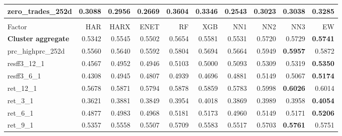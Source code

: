 \begin{longtable}{>{\raggedright\arraybackslash}p{2.6cm}rrrrrrrrr}
zero\_trades\_252d & 0.3088 & 0.2956 & 0.2669 & \textbf{\cellcolor{blue!10}0.3604} & \cellcolor{blue!10}0.3346 & 0.2543 & 0.3023 & 0.3038 & \cellcolor{blue!10}0.3285 \\
\hline
\multicolumn{10}{@{}l}{\textit{Panel F. Momentum}} \\
\hline
Factor & HAR & HARX & ENET & RF & XGB & NN1 & NN2 & NN3 & EW \\
\hline
\textbf{Cluster aggregate} & 0.5342 & \cellcolor{blue!10}0.5545 & \cellcolor{blue!10}0.5502 & \cellcolor{blue!10}0.5654 & \cellcolor{blue!10}0.5581 & \cellcolor{blue!10}0.5531 & \cellcolor{blue!10}0.5720 & \cellcolor{blue!10}0.5729 & \textbf{\cellcolor{blue!10}0.5741} \\
prc\_highprc\_252d & 0.5560 & \cellcolor{blue!10}0.5640 & \cellcolor{blue!10}0.5592 & \cellcolor{blue!10}0.5804 & \cellcolor{blue!10}0.5694 & \cellcolor{blue!10}0.5664 & \cellcolor{blue!10}0.5949 & \textbf{\cellcolor{blue!10}0.5957} & \cellcolor{blue!10}0.5872 \\
resff3\_12\_1 & 0.4567 & \cellcolor{blue!10}0.4952 & \cellcolor{blue!10}0.4946 & \cellcolor{blue!10}0.5103 & \cellcolor{blue!10}0.5000 & \cellcolor{blue!10}0.5093 & \cellcolor{blue!10}0.5309 & \cellcolor{blue!10}0.5319 & \textbf{\cellcolor{blue!10}0.5350} \\
resff3\_6\_1 & 0.4308 & \cellcolor{blue!10}0.4945 & \cellcolor{blue!10}0.4807 & \cellcolor{blue!10}0.4939 & \cellcolor{blue!10}0.4696 & \cellcolor{blue!10}0.4881 & \cellcolor{blue!10}0.5149 & \cellcolor{blue!10}0.5067 & \textbf{\cellcolor{blue!10}0.5174} \\
ret\_12\_1 & 0.5678 & \cellcolor{blue!10}0.5871 & \cellcolor{blue!10}0.5794 & \cellcolor{blue!10}0.5878 & \cellcolor{blue!10}0.5859 & \cellcolor{blue!10}0.5783 & \cellcolor{blue!10}0.5998 & \textbf{\cellcolor{blue!10}0.6026} & \cellcolor{blue!10}0.6014 \\
ret\_3\_1 & 0.3621 & \cellcolor{blue!10}0.3881 & \cellcolor{blue!10}0.3849 & \cellcolor{blue!10}0.3954 & \cellcolor{blue!10}0.4018 & \cellcolor{blue!10}0.3869 & \cellcolor{blue!10}0.3989 & \cellcolor{blue!10}0.3958 & \textbf{\cellcolor{blue!10}0.4054} \\
ret\_6\_1 & 0.4877 & \cellcolor{blue!10}0.4983 & \cellcolor{blue!10}0.4968 & \cellcolor{blue!10}0.5181 & \cellcolor{blue!10}0.5173 & \cellcolor{blue!10}0.4960 & \cellcolor{blue!10}0.5149 & \cellcolor{blue!10}0.5171 & \textbf{\cellcolor{blue!10}0.5206} \\
ret\_9\_1 & 0.5357 & \cellcolor{blue!10}0.5558 & \cellcolor{blue!10}0.5507 & \cellcolor{blue!10}0.5709 & \cellcolor{blue!10}0.5583 & \cellcolor{blue!10}0.5517 & \cellcolor{blue!10}0.5703 & \textbf{\cellcolor{blue!10}0.5761} & \cellcolor{blue!10}0.5751 \\

\end{longtable}
